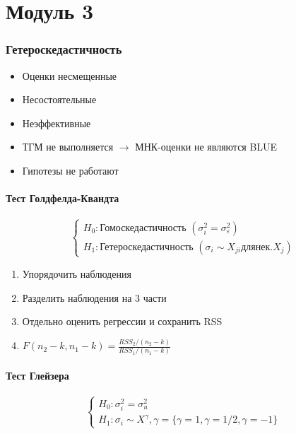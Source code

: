 \documentclass[a4paper, 12pt]{article}
\begin{document}
\tableofcontents
\pagebreak

\part{Модуль 3}

\section{Гетероскедастичность}

\begin{itemize}
    \item Оценки несмещенные
    \item Несостоятельные
    \item Неэффективные
    \item ТГМ не выполняется $\rightarrow$ МНК-оценки не являются BLUE
    \item Гипотезы не работают
\end{itemize}

\subsection{Тест Голдфелда-Квандта}

\[\begin{cases}
    H_{0}: \textrm{Гомоскедастичность } (\sigma_{i}^{2} = \sigma_{\varepsilon}^{2}) \\
    H_{1}: \textrm{Гетероскедастичность } (\sigma_{i} \sim X_{ji} для нек. X_{j})
\end{cases}\]

\begin{enumerate}
    \item Упорядочить наблюдения
    \item Разделить наблюдения на 3 части
    \item Отдельно оценить регрессии и сохранить RSS
    \item $F(n_{2} - k, n_{1} - k) = \frac{RSS_{2}/(n_{2} - k)}{RSS_{1} / (n_{1} - k)}$
\end{enumerate}

\subsection{Тест Глейзера}

\[\begin{cases}
    H_{0}: \sigma_{i}^{2} = \sigma_{u}^{2} \\
    H_{1}: \sigma_{i} \sim X^{\gamma}, \gamma = \{\gamma = 1, \gamma = 1/2, \gamma = -1\}
\end{cases}\]
\end{document}
